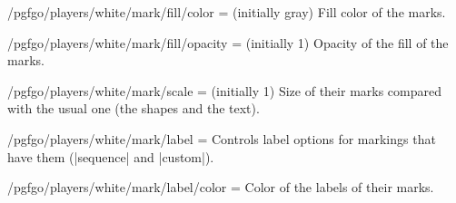 \begin{goban}[9, stone = {radius = 4pt}, mark = {line = {color = red}}]
\begin{key}{/pgfgo/players/white/mark/fill/color =  (initially gray)}
	Fill color of the marks.
\end{key}

\begin{key}{/pgfgo/players/white/mark/fill/opacity =  (initially 1)}
	Opacity of the fill of the marks.

	\begin{codeexample}[width=4cm]

		\begin{goban}[3]
		\end{goban}
	\end{codeexample}
\end{key}

\begin{key}{/pgfgo/players/white/mark/scale =  (initially 1)}
	Size of their marks compared with the usual one (the shapes and the text).

	\begin{codeexample}[width=4cm]

		\begin{goban}[3]
		\end{goban}
	\end{codeexample}
\end{key}

\begin{key}{/pgfgo/players/white/mark/label = }
	Controls label options for markings that have them (|sequence| and |custom|).

	\begin{codeexample}[width=4cm]

		\begin{goban}[3]
		\end{goban}
	\end{codeexample}
\end{key}

\begin{key}{/pgfgo/players/white/mark/label/color = }
	Color of the labels of their marks.
\end{key}


\end{goban}

